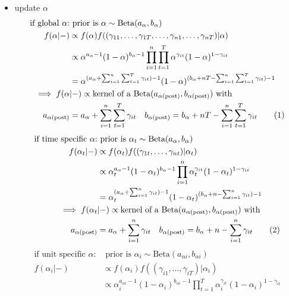 \documentclass[12pt,	%
	a4paper,		%
	twoside,		%
	openright,		%
	titlepage,%
	]{book}
\theoremstyle{definition}
\begin{document}
\begin{itemize}
\item update $\alpha$
\begin{align*}
    \text{if global $\alpha$:} & \text{ prior is $\alpha \sim \text{Beta}(a_\alpha, b_\alpha)$}\\
    f(\alpha|-) & \propto f(\alpha) f((\gamma_{11}, \ldots,\gamma_{1T}, \ldots, \gamma_{n1}, \ldots, \gamma_{nT})|\alpha)\\
    & \propto \alpha^{a_\alpha-1}(1-\alpha)^{b_\alpha-1} \prod_{i=1}^n \prod_{t=1}^T \alpha^{\gamma_{it}}(1-\alpha)^{1-\gamma_{it}}\\
    & = \alpha^{(a_\alpha+\sum_{i=1}^n \sum_{t=1}^T \gamma_{it})-1} (1-\alpha)^{(b_\alpha+nT-\sum_{i=1}^n \sum_{t=1}^T \gamma_{it})-1}\\
    \implies f(\alpha&|-)\propto \text{kernel of a $\Beta(a_{\postp{\alpha}},b_{\postp{\alpha}})$ with}\\
    a_{\postp{\alpha}} &= a_\alpha+\sum_{i=1}^n \sum_{t=1}^T \gamma_{it} \quad
    b_{\postp{\alpha}} = b_\alpha+nT-\sum_{i=1}^n \sum_{t=1}^T \gamma_{it}
\tag{\stepcounter{equation}\theequation}
\end{align*}
\begin{align*}
    \text{if time specific $\alpha$:} & \text{ prior is $\alpha_t \sim \text{Beta}(a_\alpha, b_\alpha)$}\\
    f(\alpha_t|-) & \propto f(\alpha_t) f((\gamma_{1t}, \ldots, \gamma_{nt})|\alpha_t)\\
    & \propto \alpha_t^{a_\alpha-1}(1-\alpha_t)^{b_\alpha-1} \prod_{i=1}^n \alpha_t^{\gamma_{it}}(1-\alpha_t)^{1-\gamma_{it}}\\
    & = \alpha_t^{(a_\alpha+\sum_{i=1}^n \gamma_{it})-1} (1-\alpha_t)^{(b_\alpha+n-\sum_{i=1}^n \gamma_{it})-1}\\
    \implies f(\alpha_t&|-)\propto \text{kernel of a $\Beta(a_{\postp{\alpha}},b_{\postp{\alpha}})$ with}\\
    a_{\postp{\alpha}} &= a_\alpha+\sum_{i=1}^n \gamma_{it} \quad
    b_{\postp{\alpha}} = b_\alpha+n-\sum_{i=1}^n \gamma_{it}
\tag{\stepcounter{equation}\theequation}
\end{align*}
\begin{align*}
    \text{if unit specific $\alpha$:}& \text{ prior is $\alpha_{i} \sim \text{Beta}(a_{\alpha i}, b_{\alpha i})$}\\
    f(\alpha_{i}|-) & \propto f(\alpha_{i}) f((\gamma_{i1}, \ldots, \gamma_{iT})|\alpha_{i})\\
    & \propto \alpha_{i}^{a_{\alpha i}-1}(1-\alpha_{i})^{b_{\alpha i}-1} \prod_{t=1}^T \alpha_i^{\gamma_{it}}(1-\alpha_i)^{1-\gamma_{it}}\\

\end{align*}
\end{itemize}
\end{document}
